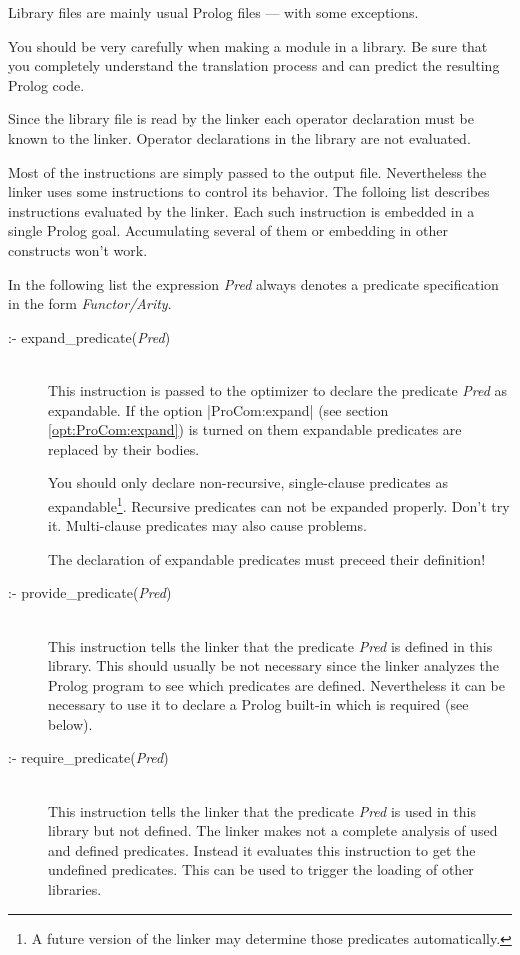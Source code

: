 Library files are mainly usual Prolog files --- with some exceptions.

You should be very carefully when making a module in a library. Be sure that
you completely understand the translation process and can predict the
resulting Prolog code.

Since the library file is read by the linker each operator declaration must be
known to the linker. Operator declarations in the library are not evaluated.

Most of the instructions are simply passed to the output file. Nevertheless the
linker uses some instructions to control its behavior. The folloing list
describes instructions evaluated by the linker. Each such instruction is
embedded in a single Prolog goal. Accumulating several of them or embedding in
other constructs won't work.

In the following list the expression {\em Pred} always denotes a predicate
specification in the form {\em Functor/Arity}.
\begin{description}
  \item [:- expand\_predicate({\em Pred})]\ \\
  This instruction is passed to the optimizer to declare the predicate {\em
  Pred} as expandable. If the option |ProCom:expand| (see section
  \ref{opt:ProCom:expand}) is turned on them expandable predicates are
  replaced by their bodies.

  You should only declare non-recursive, single-clause predicates as
  expandable\footnote{A future version of the linker may determine those
  predicates automatically.}.  Recursive predicates can not be expanded
  properly.  Don't try it. Multi-clause predicates may also cause problems.

  The declaration of expandable predicates must preceed their definition!

  \item [:- provide\_predicate({\em Pred})]\ \\
  This instruction tells the linker that the predicate {\em Pred} is defined
  in this library. This should usually be not necessary since the linker
  analyzes the Prolog program to see which predicates are defined.
  Nevertheless it can be necessary to use it to declare a Prolog built-in
  which is required (see below).

  \item [:- require\_predicate({\em Pred})]\ \\
  This instruction tells the linker that the predicate {\em Pred} is used in
  this library but not defined. The linker makes not a complete analysis of
  used and defined predicates. Instead it evaluates this instruction to get
  the undefined predicates. This can be used to trigger the loading of other
  libraries.
\end{description}


